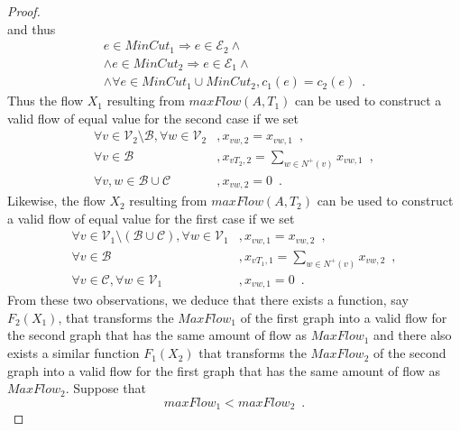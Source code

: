 \documentclass[11pt]{llncs}
\begin{document}
\begin{proof}
\begin{equation}
       \end{equation}
       and thus
       \begin{equation}
       \begin{gathered}
          e \in MinCut_1 \Rightarrow e \in \mathcal{E}_2 \wedge \\
          \wedge e \in MinCut_2 \Rightarrow e \in \mathcal{E}_1 \wedge \\
          \wedge \forall e \in MinCut_1 \cup MinCut_2, c_1(e) = c_2(e) \enspace.
       \end{gathered}
       \end{equation}
       Thus the flow $X_1$ resulting from $maxFlow(A, T_1)$ can be used to construct a valid flow of equal
       value for the second case if we set
       \begin{align}
          \forall v \in \mathcal{V}_2 \setminus \mathcal{B}, \forall w \in \mathcal{V}_2&, x_{vw,2} = x_{vw,1} \enspace, \\
          \forall v \in \mathcal{B}&, x_{vT_2,2} = \sum\limits_{w \in N^{+}(v)}x_{vw,1} \enspace, \\
          \forall v,w \in \mathcal{B} \cup \mathcal{C}&, x_{vw,2} = 0 \enspace.
       \end{align}
       Likewise, the flow $X_2$ resulting from $maxFlow(A, T_2)$ can be
       used to construct a valid flow of equal value for the first case if we set
       \begin{align}
          \forall v \in \mathcal{V}_1 \setminus (\mathcal{B} \cup \mathcal{C}), \forall w \in \mathcal{V}_1&, x_{vw,1} =
          x_{vw,2} \enspace, \\
          \forall v \in \mathcal{B}&, x_{vT_1,1} = \sum\limits_{w \in N^{+}(v)}x_{vw,2} \enspace, \\
          \forall v \in \mathcal{C}, \forall w \in \mathcal{V}_1&, x_{vw,1} = 0 \enspace.
       \end{align}
       From these two observations, we deduce that there exists a function, say $F_2(X_1)$, that transforms
       the $MaxFlow_1$ of the first graph into a valid flow for the second graph that has the same amount of flow as
       $MaxFlow_1$ and there also exists a similar function $F_1(X_2)$ that transforms the $MaxFlow_2$ of the second graph
       into a valid flow for the first graph that has the same amount of flow as $MaxFlow_2$. Suppose that
       \begin{equation}
         maxFlow_1 < maxFlow_2 \enspace.
       \end{equation}

\end{proof}
\end{document}
